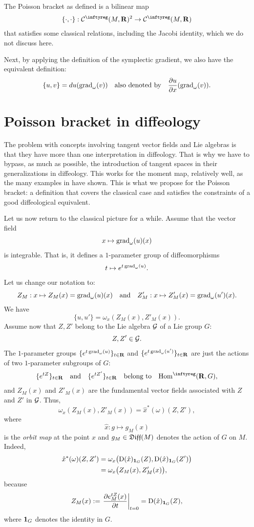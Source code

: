 The Poisson bracket as defined is a bilinear map
$$
  \{\cdot,\cdot\} : \Cinfty(M,\RR)^2 \to \Cinfty(M,\RR)
$$
that satisfies some classical relations, including the Jacobi identity, which we do not discuss here.

Next,
by applying the definition of the symplectic gradient,
we also have the equivalent definition:
$$
  \{u,v\} = du(\operatorname{grad}_\omega(v))
  \quad \text{also denoted by} \quad
  {\partial u \over \partial x}(\operatorname{grad}_\omega(v)).
$$


\section{Poisson bracket in diffeology}

The problem with concepts involving tangent vector fields and Lie algebras is that they have more than one interpretation in diffeology.
That is why we have to bypass, as much as possible, the introduction of tangent spaces in their generalizations in diffeology.
This works for the moment map,
relatively well,
as the many examples in \cite{PIZ10} have shown.
This is what we propose for the Poisson bracket:
a definition that covers the classical case and satisfies the constraints of a good diffeological equivalent.

Let us now return to the classical picture for a while.
Assume that the vector field
$$
  x \mapsto \operatorname{grad}_\omega(u)(x)
$$
is integrable.
That is,
it defines a $1$-parameter group of diffeomorphisms
$$
  t \mapsto e^{t\operatorname{grad}_\omega(u)}.
$$
Let us change our notation to:
$$
  Z_M : x \mapsto Z_M(x) = \operatorname{grad}_\omega(u)(x)
  \quad \text{and} \quad
  Z'_M : x \mapsto Z'_M(x) = \operatorname{grad}_\omega(u')(x).
$$
We have
$$
  \{u,u'\} = \omega_x(Z_M(x), Z'_M(x)).
$$
Assume now that $Z, Z'$ belong to the Lie algebra $\mathcal{G}$ of a Lie group $G$:
$$
  Z, Z' \in \mathcal{G}.
$$
The $1$-parameter groups $\{e^{t\operatorname{grad}_\omega(u)}\}_{t \in \mathbf{R}}$ and $\{e^{t\operatorname{grad}_\omega(u')}\}_{t \in \mathbf{R}}$ are just the actions of two $1$-parameter subgroups of $G$:
$$
  \{e^{tZ}\}_{t \in \RR}
  \quad \text{and} \quad
  \{e^{tZ'}\}_{t \in \RR}
  \quad \text{belong to} \quad
  \Hom^\infty(\RR, G),
$$
and $Z_M(x)$ and $Z'_M(x)$ are the fundamental vector fields associated with $Z$ and $Z'$ in $\mathcal{G}$.
Thus,
$$
  \omega_x(Z_M(x), Z'_M(x)) = \hat x^*(\omega)(Z,Z'),
$$
where
$$
  \hat x : g \mapsto g_M(x)
$$
is the \emph{orbit map} at the point $x$ and $g_M \in \mathfrak{Diff}(M)$ denotes the action of $G$ on $M$.
Indeed,
\begin{align*}
  \hat x^*(\omega)(Z,Z') & = \omega_x\bigl(\operatorname{D}(\hat x)_{{\mathbf{1}}_G}(Z), \operatorname{D}(\hat x)_{{\mathbf{1}}_G}(Z')\bigr) \\
  & = \omega_x\bigl(Z_M(x), Z'_M(x)\bigr),
\end{align*}
because
$$
  Z_M(x) := \left.{\partial e^{tZ}_M(x) \over \partial t}\right|_{t=0} = \operatorname{D}(\hat x)_{{\mathbf{1}}_G}(Z),
$$
where ${\mathbf{1}}_G$ denotes the identity in $G$.

